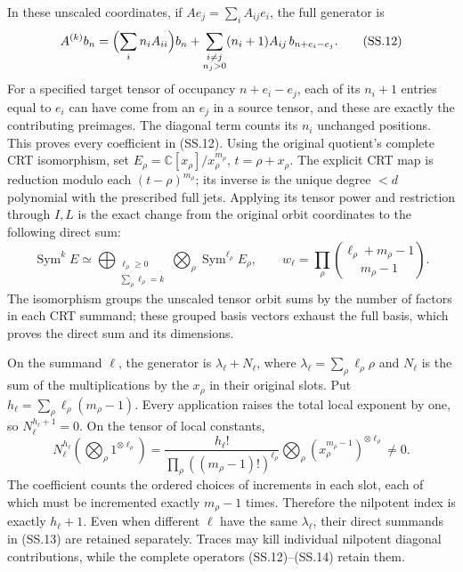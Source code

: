 In these unscaled coordinates, if \(Ae_j=\sum_i A_{ij}e_i\),
the full generator is
\[
 A^{(k)} b_n=\Bigl(\sum_i n_i A_{ii}\Bigr)b_n
  +\sum_{\substack{i\ne j\\n_j>0}}
       (n_i+1)A_{ij}\,b_{n+e_i-e_j}.                  \tag{SS.12}
\]
For a specified target tensor of occupancy \(n+e_i-e_j\),
each of its \(n_i+1\) entries equal to \(e_i\) can have
come from an \(e_j\) in a source tensor, and these are exactly
the contributing preimages.  The diagonal term counts its \(n_i\)
unchanged positions.  This proves every coefficient in (SS.12).
Using the original quotient's complete CRT isomorphism, set
\(E_\rho=\mathbb C[x_\rho]/x_\rho^{m_\rho}\),
\(t=\rho+x_\rho\).  The explicit CRT map is reduction modulo
each \((t-\rho)^{m_\rho}\); its inverse is the unique degree
\(<d\) polynomial with the prescribed full jets.  Applying its
tensor power and restriction through \(I,L\) is the exact change
from the original orbit coordinates to the following direct sum:
\[
 \operatorname{Sym}^k E\simeq
 \bigoplus_{\substack{\ell_\rho\ge0\\\sum_\rho\ell_\rho=k}}
       \bigotimes_\rho\operatorname{Sym}^{\ell_\rho}E_\rho,
 \qquad
 w_\ell=\prod_\rho\binom{\ell_\rho+m_\rho-1}{m_\rho-1}.
                                                               \tag{SS.13}
\]
The isomorphism groups the unscaled tensor orbit sums by the number
of factors in each CRT summand; these grouped basis vectors exhaust
the full basis, which proves the direct sum and its dimensions.

On the summand \(\ell\), the generator is
\(\lambda_\ell+N_\ell\), where
\(\lambda_\ell=\sum_\rho\ell_\rho\rho\) and
\(N_\ell\) is the sum of the multiplications by the
\(x_\rho\) in their original slots.  Put
\(h_\ell=\sum_\rho\ell_\rho(m_\rho-1)\).
Every application raises the total local exponent by one, so
\(N_\ell^{h_\ell+1}=0\).  On the tensor of local constants,
\[
 N_\ell^{h_\ell}(\bigotimes_\rho1^{\otimes\ell_\rho})
 =\frac{h_\ell!}
        {\prod_\rho((m_\rho-1)!)^{\ell_\rho}}
       \bigotimes_\rho
               (x_\rho^{m_\rho-1})^{\otimes\ell_\rho}\ne0.
                                                               \tag{SS.14}
\]
The coefficient counts the ordered choices of increments in each
slot, each of which must be incremented exactly \(m_\rho-1\)
times.  Therefore the nilpotent index is exactly \(h_\ell+1\).
Even when different \(\ell\) have the same
\(\lambda_\ell\), their direct summands in (SS.13) are
retained separately.  Traces may kill individual nilpotent diagonal
contributions, while the complete operators (SS.12)--(SS.14) retain
them.

